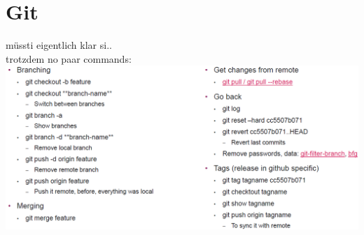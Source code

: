 
\columnbreak
\section{Git}
müssti eigentlich klar si..\\
trotzdem no paar commands:\\
\includegraphics[width=\linewidth]{../img/git.png}